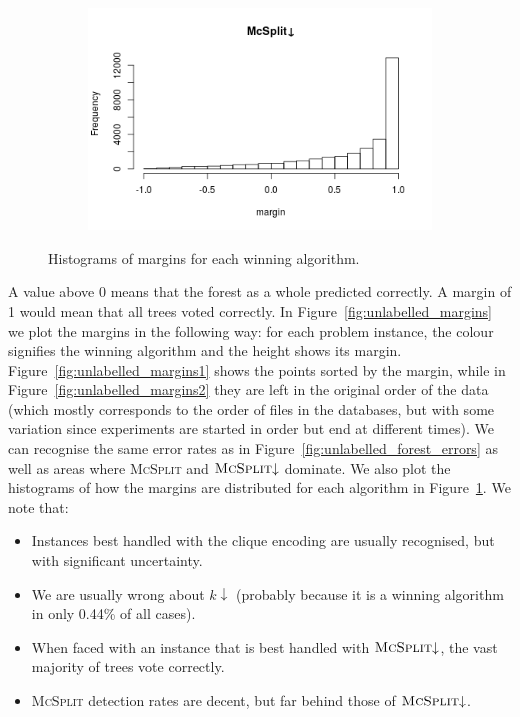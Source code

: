 \documentclass{l4proj}
\theoremstyle{definition}
\theoremstyle{remark}
\begin{document}
\begin{figure}
\begin{subfigure}[t]{0.49\textwidth}
  \end{subfigure}
  \begin{subfigure}[t]{0.49\textwidth}
    \centering
    \includegraphics[width=\textwidth]{images/mcsplitdown_hist.png}
  \end{subfigure}
  \caption{Histograms of margins for each winning algorithm.}
  \label{fig:unlabelled_margin_hist}
\end{figure}

A value above 0 means that the forest as a whole predicted correctly. A margin
of 1 would mean that all trees voted correctly. In
Figure~\ref{fig:unlabelled_margins} we plot the margins in the following way:
for each problem instance, the colour signifies the winning algorithm and the
height shows its margin. Figure~\ref{fig:unlabelled_margins1} shows the points
sorted by the margin, while in Figure~\ref{fig:unlabelled_margins2} they are
left in the original order of the data (which mostly corresponds to the order of
files in the databases, but with some variation since experiments are started in
order but end at different times). We can recognise the same error rates as in
Figure~\ref{fig:unlabelled_forest_errors} as well as areas where
\textsc{McSplit} and $\textsc{McSplit}{\downarrow}$ dominate. We also plot the
histograms of how the margins are distributed for each algorithm in
Figure~\ref{fig:unlabelled_margin_hist}. We note that:

\begin{itemize}
\item Instances best handled with the clique encoding are usually recognised, but
  with significant uncertainty.
\item We are usually wrong about $k{\downarrow}$ (probably because it is a
  winning algorithm in only 0.44\% of all cases).
\item When faced with an instance that is best handled with
  $\textsc{McSplit}{\downarrow}$, the vast majority of trees vote correctly.
\item \textsc{McSplit} detection rates are decent, but far behind those of
  $\textsc{McSplit}{\downarrow}$.
\end{itemize}
\end{document}
